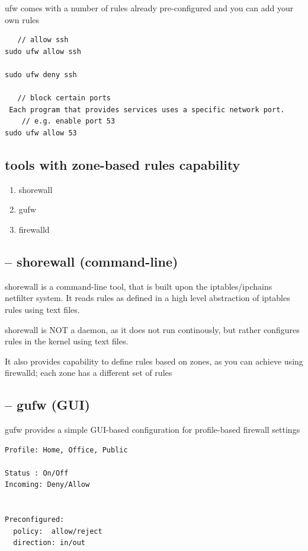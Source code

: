  ufw comes with a number of rules already pre-configured and you can add your
own rules
\begin{verbatim}
   // allow ssh
sudo ufw allow ssh 

sudo ufw deny ssh

   // block certain ports
 Each program that provides services uses a specific network port.
    // e.g. enable port 53 
sudo ufw allow 53   
\end{verbatim}

\subsection{tools with zone-based rules capability}

\begin{enumerate}
  \item shorewall
  
  \item gufw 
  
  \item firewalld
\end{enumerate}

\subsection{-- shorewall (command-line)}
\label{sec:shorewall}

shorewall is a command-line tool, that is built upon the iptables/ipchains
netfilter system. It reads rules as defined in a high level abstraction of
iptables rules using text files.

shorewall is NOT a daemon, as it does not run continously, but rather configures
rules in the kernel using text files. 

It also provides capability to define rules based on zones, as you can achieve
using firewalld; each zone has a different set of rules

\subsection{-- gufw (GUI)}
\label{sec:gufw}

gufw provides a simple GUI-based configuration for profile-based firewall
settings
\begin{verbatim}
Profile: Home, Office, Public

Status : On/Off
Incoming: Deny/Allow


Preconfigured: 
  policy:  allow/reject
  direction: in/out
  
\end{verbatim}

